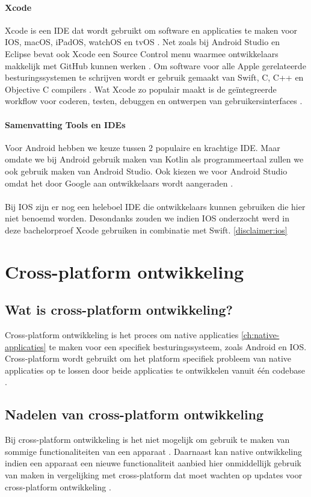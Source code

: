 \paragraph{Xcode}
Xcode is een IDE dat wordt gebruikt om software en applicaties te maken voor IOS, macOS, 
iPadOS, watchOS en tvOS \autocite{jahnavisarora2020}. Net zoals bij Android Studio en 
Eclipse bevat ook Xcode een Source Control menu waarmee ontwikkelaars makkelijk met GitHub 
kunnen werken \autocite{Medewar2022}. Om software voor alle Apple gerelateerde besturingssystemen 
te schrijven wordt er gebruik gemaakt van Swift, C, C++ en Objective C compilers 
\autocite{jahnavisarora2020}. Wat Xcode zo populair maakt is de geïntegreerde workflow 
voor coderen, testen, debuggen en ontwerpen van gebruikersinterfaces \autocite{jahnavisarora2020}.

\paragraph{Samenvatting Tools en IDEs}
Voor Android hebben we keuze tussen 2 populaire en krachtige IDE. Maar omdate we bij Android 
gebruik maken van Kotlin als programmeertaal zullen we ook gebruik maken van Android Studio. 
Ook kiezen we voor Android Studio omdat het door Google aan ontwikkelaars wordt aangeraden 
\autocite{Medewar2022}.
\\\\
Bij IOS zijn er nog een heleboel IDE die ontwikkelaars kunnen gebruiken die hier niet benoemd 
worden. Desondanks zouden we indien IOS onderzocht werd in deze bachelorproef Xcode gebruiken 
in combinatie met Swift. \ref{disclaimer:ios}

\section{Cross-platform ontwikkeling}

\subsection{Wat is cross-platform ontwikkeling?}
Cross-platform ontwikkeling is het proces om native applicaties \ref{ch:native-applicaties} 
te maken voor een specifiek besturingssysteem, zoals Android en IOS. Cross-platform wordt 
gebruikt om het platform specifiek probleem van native applicaties op te lossen door beide 
applicaties te ontwikkelen vanuit één codebase \autocite{Khan2021}.

\subsection{Nadelen van cross-platform ontwikkeling}
Bij cross-platform ontwikkeling is het niet mogelijk om gebruik te maken van sommige 
functionaliteiten van een apparaat \autocite{Terekhov2022}. Daarnaast kan native 
ontwikkeling indien een apparaat een nieuwe functionaliteit aanbied hier onmiddellijk gebruik 
van maken in vergelijking met cross-platform dat moet wachten op updates voor cross-platform 
ontwikkeling \autocite{Sakovich22023}.

